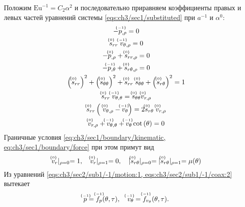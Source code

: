 Положим $\text{Eu}^{-1} = C_2 \alpha^2$ и последовательно приравняем коэффициенты правых и левых частей уравнений системы \cref{eqs:ch3/sec1/substituted} при $a^{-1}$ и $\alpha^0$:
\begin{subequations}
  \label{eqs:ch3/sec2/sub1/main}
  \begin{gather}
    \label{eqs:ch3/sec2/sub1/-1/motion:1}
    -\uindex{p}{-1}_{,\rho} = 0
    \\
    \label{eqs:ch3/sec2/sub1/-1/coax:2}
    \uindex{s}{0}_{rr} \; \uindex{v}{-1}_{\theta,\rho} = 0
    \\
    \label{eqs:ch3/sec2/sub1/0/motion:1}
    -\uindex{p}{0}_{,\rho} + \uindex{s}{0}_{rr,\rho} = 0
    \\
    \label{eqs:ch3/sec2/sub1/0/motion:2}
    -\uindex{p}{-1}_{,\theta} + \uindex{s}{0}_{r\theta,\rho} = 0
    \\
    \label{eqs:ch3/sec2/sub1/0/plasticity}
    \left(\uindex{s}{0}_{rr}\right)^2 + \left(\uindex{s}{0}_{\theta\theta}\right)^2 + \uindex{s}{0}_{rr}\; \uindex{s}{0}_{\theta\theta} + \left(\uindex{s}{0}_{r\theta}\right)^2 = 1
    \\
    \label{eqs:ch3/sec2/sub1/0/coax:1}
    \uindex{s}{0}_{rr} \; \uindex{v}{-1}_{\theta,\theta} = \uindex{s}{0}_{\theta\theta} \uindex{v}{0}_{r,\rho}
    \\
    \label{eqs:ch3/sec2/sub1/0/coax:2}
    \uindex{s}{0}_{rr} \left(\ \uindex{v}{0}_{\theta,\rho} - \uindex{v}{-1}_{\theta}\right) = 2 \uindex{s}{0}_{r\theta} \; \uindex{v}{0}_{r,\rho}
    \\
    \label{eqs:ch3/sec2/sub1/0/uncompress}
    \uindex{v}{0}_{r,\rho} + \uindex{v}{-1}_{\theta,\theta} + \uindex{v}{-1}_{\theta} \cot{\left(\theta\right)} = 0
  \end{gather}
\end{subequations}
Граничные условия \cref{eq:ch3/sec1/boundary/kinematic, eq:ch3/sec1/boundary/force} при этом примут вид
\begin{equation}
  \label{eq:ch3/sec2/sub1/boundary/0}
  \uindex{v}{0}_{r}\lvert_{\rho=0} = 1, \quad \uindex{v}{0}_{r}\lvert_{\rho=1} = 0, \quad \lvert \uindex{s}{0}_{r\theta}\lvert_{\rho=0} = \lvert \uindex{s}{0}_{r\theta}\lvert_{\rho=1} = \mu(\theta)
\end{equation}
Из уравнений \cref{eqs:ch3/sec2/sub1/-1/motion:1, eqs:ch3/sec2/sub1/-1/coax:2} вытекает
\begin{equation*}
  \uindex{p}{-1} = \uindex{f}{-1}_{p}(\theta, \tau), \quad \uindex{v}{-1}_{\theta} = \uindex{f}{-1}_{v_{\theta}}(\theta, \tau).
\end{equation*}
